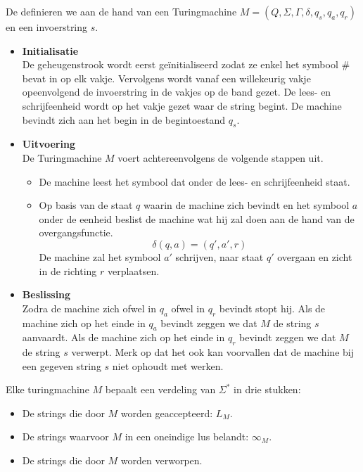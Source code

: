 \documentclass[main.tex]{subfiles}
\begin{document}
\begin{de}
  De  definieren we aan de hand van een Turingmachine $M = (Q,\Sigma,\Gamma, \delta, q_{s}, q_{a}, q_{r})$ en een invoerstring $s$.
  \begin{itemize}
  \item \textbf{Initialisatie}\\
    De geheugenstrook wordt eerst ge\"initialiseerd zodat ze enkel het symbool $\#$ bevat in op elk vakje.
    Vervolgens wordt vanaf een willekeurig vakje opeenvolgend de invoerstring in de vakjes op de band gezet.
    De lees- en schrijfeenheid wordt op het vakje gezet waar de string begint.
    De machine bevindt zich aan het begin in de begintoestand $q_{s}$.
  \item \textbf{Uitvoering}\\
    De Turingmachine $M$ voert achtereenvolgens de volgende stappen uit.
    \begin{itemize}
    \item De machine leest het symbool dat onder de lees- en schrijfeenheid staat.
    \item Op basis van de staat $q$ waarin de machine zich bevindt en het symbool $a$ onder de eenheid beslist de machine wat hij zal doen aan de hand van de overgangsfunctie.
      \[ \delta(q,a) = (q',a',r) \]
      De machine zal het symbool $a'$ schrijven, naar staat $q'$ overgaan en zicht in de richting $r$ verplaatsen.
    \end{itemize}
  \item \textbf{Beslissing}\\
    Zodra de machine zich ofwel in $q_{a}$ ofwel in $q_{r}$ bevindt stopt hij.
    Als de machine zich op het einde in $q_{a}$ bevindt zeggen we dat $M$ de string $s$ aanvaardt.
    Als de machine zich op het einde in $q_{r}$ bevindt zeggen we dat $M$ de string $s$ verwerpt.
    Merk op dat het ook kan voorvallen dat de machine bij een gegeven string $s$ niet ophoudt met werken.
  \end{itemize}
\end{de}

\begin{de}
  Elke turingmachine $M$ bepaalt een verdeling van $\Sigma^{*}$ in drie stukken:
  \begin{itemize}
  \item De strings die door $M$ worden geaccepteerd: $L_{M}$.
  \item De strings waarvoor $M$ in een oneindige lus belandt: $\infty_{M}$.
  \item De strings die door $M$ worden verworpen.
  \end{itemize}
\end{de}
\end{document}
